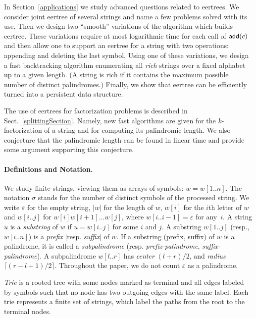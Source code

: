 \documentclass{llncs}
\def\add{{\sf add}}
\begin{document}
In Section~\ref{applications} we study  advanced questions related to eertrees. We consider joint eertree of several strings and name a few problems solved with its use. Then we design two ``smooth'' variations of the algorithm which builds eertree. These variations require at most logarithmic time for each call of $\add(c)$ and then allow one to support an eertree for a string with two operations: appending and deleting the last symbol. Using one of these variations, we design a fast backtracking algorithm enumerating all \emph{rich} strings over a fixed alphabet up to a given length. (A string is rich if it contains the maximum possible number of distinct palindromes.) Finally, we show that eertree can be efficiently turned into a persistent data structure.
 
The use of eertrees for factorization problems is described in Sect.~\ref{splittingSection}. Namely, new fast algorithms are given for the $k$-factorization of a string and for computing its palindromic length. We also conjecture that the palindromic length can be found in linear time and provide some argument supporting this conjecture.


\paragraph*{Definitions and Notation.}

We study finite strings, viewing them as arrays of symbols: $w=w[1..n]$. The notation $\sigma$ stands for the number of distinct symbols of the processed string. We write $\varepsilon$ for the empty string, $|w|$ for the length of $w$, $w[i]$ for the $i$th letter of $w$ and $w[i..j]$ for $w[i]w[i{+}1]\ldots w[j]$, where $w[i..i{-}1] = \varepsilon$ for any~$i$. A string $u$ is a \emph{substring} of $w$ if $u=w[i..j]$ for some $i$ and $j$. A substring $w[1..j]$ (resp., $w[i..n]$) is a \emph{prefix} [resp. \emph{suffix}] of $w$.  If a substring (prefix, suffix) of $w$ is a palindrome, it is called a \emph{subpalindrome} (resp. \emph{prefix-palindrome},\emph{ suffix-palindrome}). A subpalindrome $w[l..r]$ has \emph{center} $(l{+}r)/2$, and \emph{radius} $\lceil (r{-}l{+}1)/2 \rceil$. Throughout the paper, we do not count $\varepsilon$ as a palindrome. 

\emph{Trie} is a rooted tree with some nodes marked as terminal and all edges labeled by symbols such that no node has two outgoing edges with the same label. Each trie represents a finite set of strings, which label the paths from the root to the terminal nodes.
\end{document}
